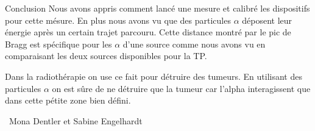 \documentclass[a4paper,11pt]{scrartcl}
\begin{document}
 \begin{section}{Conclusion}
  Nous avons appris comment lancé une mesure et calibré les dispositifs pour cette mésure. En plus nous avons vu que des particules $\alpha$ déposent leur énergie après un certain trajet parcouru. Cette distance montré par le pic de Bragg est spécifique pour les $\alpha$ d'une source comme nous avons vu en comparaisant les deux sources disponibles pour la TP.
  
  Dans la radiothérapie on use ce fait pour détruire des tumeurs. En utilisant des particules $\alpha$ on est sûre de ne détruire que la tumeur car l'alpha interagissent que dans cette pétite zone bien défini.
 \end{section}

 \vspace{1cm}
 \begin{flushright}
  \titlefont \textcopyleft\ Mona Dentler et Sabine Engelhardt
 \end{flushright}
\end{document}
